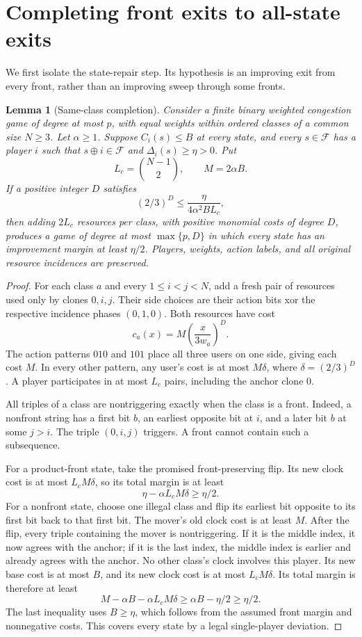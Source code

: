 \documentclass[11pt]{article}
\newtheorem{lemma}[theorem]{Lemma}
\theoremstyle{definition}
\theoremstyle{remark}
\newcommand{\F}{\mathcal F}
\newcommand{\xor}{\mathbin{\oplus}}
\begin{document}
\section{Completing front exits to all-state exits}\label{sec:completion}
We first isolate the state-repair step. Its hypothesis is an improving exit from every front, rather than an improving sweep through some fronts.

\begin{lemma}[Same-class completion]\label{lem:completion}
Consider a finite binary weighted congestion game of degree at most $p$, with equal weights within ordered classes of a common size $N\ge3$. Let $\alpha\ge1$. Suppose $C_i(s)\le B$ at every state, and every $s\in\F$ has a player $i$ such that $s\xor i\in\F$ and $\Delta_i(s)\ge\eta>0$. Put
\[
 L_c=\binom{N-1}{2},\qquad M=2\alpha B.
\]
If a positive integer $D$ satisfies
\begin{equation}\label{eq:clockbudget}
 (2/3)^D\le\frac{\eta}{4\alpha^2BL_c},
\end{equation}
then adding $2L_c$ resources per class, with positive monomial costs of degree $D$, produces a game of degree at most $\max\{p,D\}$ in which every state has an improvement margin at least $\eta/2$. Players, weights, action labels, and all original resource incidences are preserved.
\end{lemma}
\begin{proof}
For each class $a$ and every $1\le i<j<N$, add a fresh pair of resources used only by clones $0,i,j$. Their side choices are their action bits xor the respective incidence phases $(0,1,0)$. Both resources have cost
\[
 c_a(x)=M\left(\frac{x}{3w_a}\right)^D.
\]
The action patterns $010$ and $101$ place all three users on one side, giving each cost $M$. In every other pattern, any user's cost is at most $M\delta$, where $\delta=(2/3)^D$. A player participates in at most $L_c$ pairs, including the anchor clone $0$.

All triples of a class are nontriggering exactly when the class is a front. Indeed, a nonfront string has a first bit $b$, an earliest opposite bit at $i$, and a later bit $b$ at some $j>i$. The triple $(0,i,j)$ triggers. A front cannot contain such a subsequence.

For a product-front state, take the promised front-preserving flip. Its new clock cost is at most $L_cM\delta$, so its total margin is at least
\[
 \eta-\alpha L_cM\delta\ge\eta/2.
\]
For a nonfront state, choose one illegal class and flip its earliest bit opposite to its first bit back to that first bit. The mover's old clock cost is at least $M$. After the flip, every triple containing the mover is nontriggering. If it is the middle index, it now agrees with the anchor; if it is the last index, the middle index is earlier and already agrees with the anchor. No other class's clock involves this player. Its new base cost is at most $B$, and its new clock cost is at most $L_cM\delta$. Its total margin is therefore at least
\[
 M-\alpha B-\alpha L_cM\delta
 \ge\alpha B-\eta/2\ge\eta/2.
\]
The last inequality uses $B\ge\eta$, which follows from the assumed front margin and nonnegative costs. This covers every state by a legal single-player deviation.
\end{proof}
\end{document}
